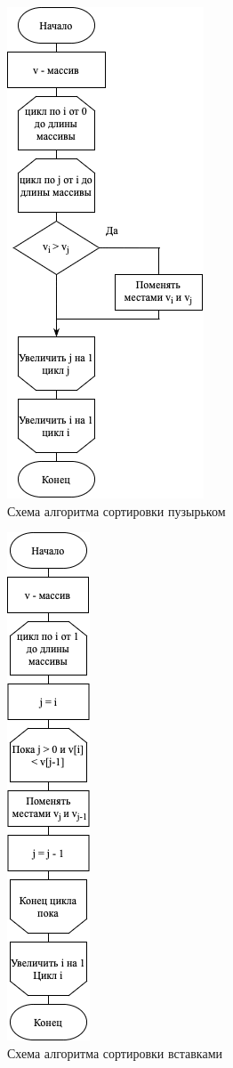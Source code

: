 \documentclass[14pt,russian]{scrartcl}
\begin{document}
\begin{figure}[h]
	\centering
	\includegraphics[scale=1]{bubble.png}
	\caption{Схема алгоритма сортировки пузырьком}
	\label{fig:bubble}
\end{figure}

\begin{figure}[h]
	\centering
	\includegraphics[scale=1]{insertion.png}
	\caption{Схема алгоритма сортировки вставками}
	\label{fig:insertion}
\end{figure}
\end{document}
